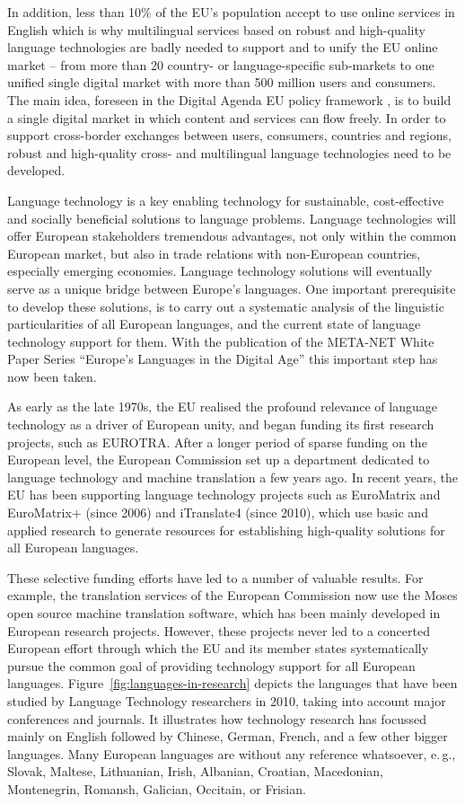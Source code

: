 \documentclass[10pt, plain]{../../metanetpaper}
\begin{document}
\begin{multicols}{2}
In addition, less than 10\% of the EU's population accept to use online services in English which is why multilingual services based on robust and high-quality language technologies are badly needed to support and to unify the EU online market -- from more than 20 country- or language-specific sub-markets to one unified single digital market with more than 500 million users and consumers. The main idea, foreseen in the Digital Agenda EU policy framework \cite{DA2010}, is to build a single digital market in which content and services can flow freely. In order to support cross-border exchanges between users, consumers, countries and regions, robust and high-quality cross- and multilingual language technologies need to be developed.

Language technology is a key enabling technology for sustainable, cost-effective and socially beneficial solutions to language problems. Language technologies will offer European stakeholders tremendous advantages, not only within the common European market, but also in trade relations with non-European countries, especially emerging economies. Language technology solutions will eventually serve as a unique bridge between Europe's languages. One important prerequisite to develop these solutions, is to carry out a systematic analysis of the linguistic particularities of all European languages, and the current state of language technology support for them. With the publication of the META-NET White Paper Series ``Europe's Languages in the Digital Age'' \cite{LWP2012} this important step has now been taken.

As early as the late 1970s, the EU realised the profound relevance of language technology as a driver of European unity, and began funding its first research projects, such as EUROTRA. After a longer period of sparse funding on the European level, the European Commission set up a department dedicated to language technology and machine translation a few years ago. In recent years, the EU has been supporting language technology projects such as EuroMatrix and EuroMatrix+ (since 2006) and iTranslate4 (since 2010), which use basic and applied research to generate resources for establishing high-quality solutions for all European languages.

These selective funding efforts have led to a number of valuable results. For example, the translation services of the European Commission now use the Moses open source machine translation software, which has been mainly developed in European research projects. However, these projects never led to a concerted European effort through which the EU and its member states systematically pursue the common goal of providing technology support for all European languages. Figure~\ref{fig:languages-in-research} depicts the languages that have been studied by Language Technology researchers in 2010, taking into account major conferences and journals. It illustrates how technology research has focussed mainly on English followed by Chinese, German, French, and a few other bigger languages. Many European languages are without any reference whatsoever, e.\,g., Slovak, Maltese, Lithuanian, Irish, Albanian, Croatian, Macedonian, Montenegrin, Romansh, Galician, Occitain, or Frisian.


\end{multicols}
\end{document}
